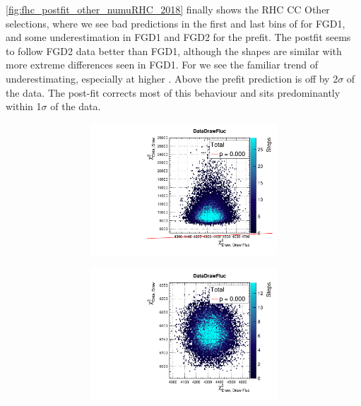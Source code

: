 \autoref{fig:fhc_postfit_other_numuRHC_2018} finally shows the \numu RHC CC Other selections, where we see bad predictions in the first and last bins of \pmu for FGD1, and some underestimation in FGD1 and FGD2 for the prefit. The postfit seems to follow FGD2 data better than FGD1, although the shapes are similar with more extreme differences seen in FGD1. For \cosmu we see the familiar trend of underestimating, especially at higher \cosmu. Above  the prefit prediction is off by 2$\sigma$ of the data. The post-fit corrects most of this behaviour and sits predominantly within 1$\sigma$ of the data.
\begin{figure}[h]
	\begin{subfigure}[t]{\textwidth}
		\begin{subfigure}[t]{0.24\textwidth}
			\includegraphics[width=\textwidth, trim={0mm 0mm 0mm 8mm}, clip,page=136]{figures/mach3/2018/data/2018a_FixedCov_RedCov_Mpi_Data_merge_PriorPred_procs}
		\end{subfigure}
		\begin{subfigure}[t]{0.24\textwidth}
			\includegraphics[width=\textwidth, trim={0mm 0mm 0mm 8mm}, clip,page=136]{figures/mach3/2018/data/2018a_FixedCov_RedCov_Mpi_Data_merge_PostPredStore_FullLLH_procs}

\end{subfigure}
\end{subfigure}
\end{figure}
